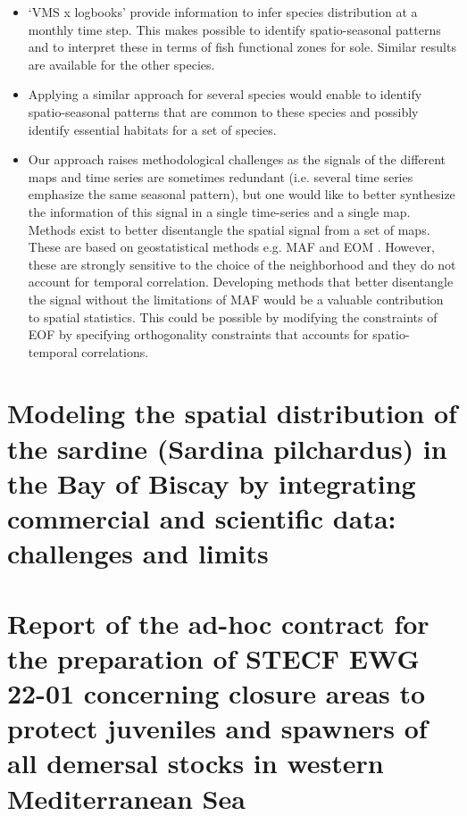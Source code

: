 \begin{itemize}

\item `VMS x logbooks' provide information to infer species distribution at a monthly time step. This makes possible to identify spatio-seasonal patterns and to interpret these in terms of fish functional zones for sole. Similar results are available for the other species.

\item Applying a similar approach for several species would enable to identify spatio-seasonal patterns that are common to these species and possibly identify essential habitats for a set of species.

\item Our approach raises methodological challenges as the signals of the different maps and time series are sometimes redundant (i.e. several time series emphasize the same seasonal pattern), but one would like to better synthesize the information of this signal in a single time-series and a single map. Methods exist to better disentangle the spatial signal from a set of maps. These are based on geostatistical methods e.g. MAF and EOM \parencite{bez2021empirical}. However, these are strongly sensitive to the choice of the neighborhood and they do not account for temporal correlation. Developing methods that better disentangle the signal without the limitations of MAF would be a valuable contribution to spatial statistics. This could be possible by modifying the constraints of EOF by specifying orthogonality constraints that accounts for spatio-temporal correlations.

\end{itemize}



\clearemptydoublepage

\section{Modeling the spatial distribution of the  sardine (Sardina pilchardus) in the Bay of Biscay by integrating commercial and scientific data: challenges and limits}\label{appendix:SardineModel}



\newpage

\section{Report of the ad-hoc contract for the preparation of STECF EWG 22-01 concerning closure areas to protect juveniles and spawners of all demersal stocks in western Mediterranean Sea}\label{appendix:STECFWG}




